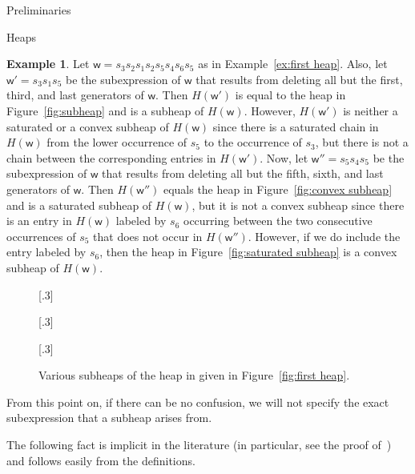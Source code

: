 \documentclass[11pt]{amsart}
\theoremstyle{definition}
\newtheorem{example}[theorem]{Example}
\numberwithin{equation}{section}
\renewcommand{\(}{\left(}
\renewcommand{\)}{\right)}
\newcommand{\w}{\mathsf{w}}
\newcommand\xxaxis{0}
\newcommand\yyaxis{90}
\newcommand\heapblock[3]{\fill[draw=black, fill=gray!30, rounded corners, line width=1.1pt, shift={(\xxaxis:#1)},shift={(\yyaxis:#2)}] (-1,-0.5) rectangle (1,0.5);\node at (#1,#2) {$#3$};}
\begin{document}
\begin{section}{Preliminaries}
\begin{subsection}{Heaps}
\begin{example}\label{ex:third heap}
Let $\w= s_3 s_2 s_1 s_2 s_5s_{4}s_{6}s_{5}$ as in Example~\ref{ex:first heap}.  Also, let $\w'=s_3 s_1 s_{5}$ be the subexpression of $\w$ that results from deleting all but the first, third, and last generators of $\w$.  Then $H(\w')$ is equal to the heap in Figure~\ref{fig:subheap} and is a subheap of $H(\w)$.  However, $H(\w')$ is neither a saturated or a convex subheap of $H(\w)$ since there is a saturated chain in $H(\w)$ from the lower occurrence of $s_{5}$ to the occurrence of $s_{3}$, but there is not a chain between the corresponding entries in $H(\w')$.  Now, let $\w''=s_{5}s_{4}s_{5}$ be the subexpression of $\w$ that results from deleting all but the fifth, sixth, and last generators of $\w$.  Then $H(\w'')$ equals the heap in Figure~\ref{fig:convex subheap} and is a saturated subheap of $H(\w)$, but it is not a convex subheap since there is an entry in $H(\w)$ labeled by $s_{6}$ occurring between the two consecutive occurrences of $s_{5}$ that does not occur in $H(\w'')$.  However, if we do include the entry labeled by $s_{6}$, then the heap in Figure~\ref{fig:saturated subheap}  is a convex subheap of $H(\w)$.  
\end{example}

\begin{figure}[!ht]
\subcaptionbox{\label{fig:subheap}}[.3\textwidth]{
}
\subcaptionbox{\label{fig:convex subheap}}[.3\textwidth]{
}
\subcaptionbox{\label{fig:saturated subheap}}[.3\textwidth]{
}
\caption{Various subheaps of the heap in given in Figure~\ref{fig:first heap}.}
\label{fig:subheaps}
\end{figure}

From this point on, if there can be no confusion, we will not specify the exact subexpression that a subheap arises from.

The following fact is implicit in the literature (in particular, see the proof of~\cite[Proposition 3.3]{Stembridge1996}) and follows easily from the definitions.


\end{subsection}
\end{section}
\end{document}
